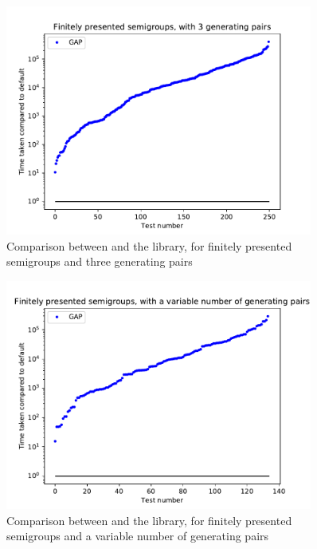 \begin{figure}[p]
  \centering
  \includegraphics[width=0.9\textwidth]{pics/ch-pairs/bench-fp-3p-gap}
  \caption[Benchmark: \GAP{}/\libsemigroups{}, finitely presented, 3 pairs]
  {Comparison between \libsemigroups{} and the \GAP{} library, for
    finitely presented semigroups and three generating pairs}
  \label{fig:bench-fp-3p-gap}
\end{figure}

\begin{figure}[p]
  \centering
  \includegraphics[width=0.9\textwidth]{pics/ch-pairs/bench-fp-vp-gap}
  \caption[Benchmark: \GAP{}/\libsemigroups{}, finitely presented, $n$ pairs]
  {Comparison between \libsemigroups{} and the \GAP{} library, for
    finitely presented semigroups and a variable number of generating pairs}
  \label{fig:bench-fp-vp-gap}
\end{figure}

